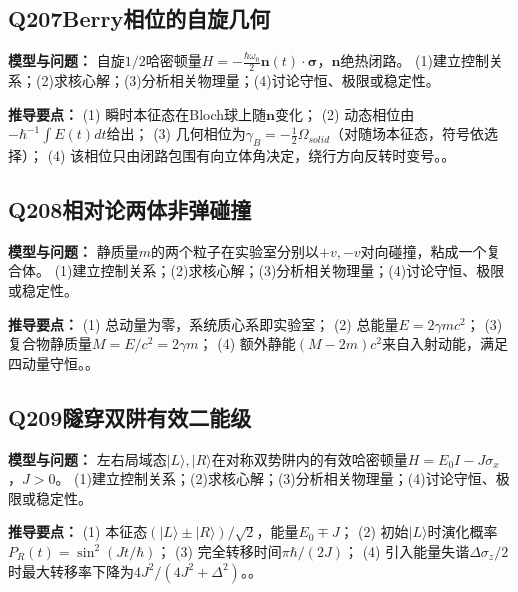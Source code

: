 \par\medskip

\subsection*{Q207\quad Berry相位的自旋几何}

\textbf{模型与问题：} 自旋$1/2$哈密顿量$H=-\frac{\hbar\omega_0}{2}\mathbf n(t)\cdot\boldsymbol\sigma$，$\mathbf n$绝热闭路。 (1)建立控制关系；(2)求核心解；(3)分析相关物理量；(4)讨论守恒、极限或稳定性。

\par\textbf{推导要点：} (1) 瞬时本征态在Bloch球上随$\mathbf n$变化； (2) 动态相位由$-\hbar^{-1}\int E(t)dt$给出； (3) 几何相位为$\gamma_B=-\frac12\Omega_{solid}$（对随场本征态，符号依选择）； (4) 该相位只由闭路包围有向立体角决定，绕行方向反转时变号。。

\par\medskip

\subsection*{Q208\quad 相对论两体非弹碰撞}

\textbf{模型与问题：} 静质量$m$的两个粒子在实验室分别以$+v,-v$对向碰撞，粘成一个复合体。 (1)建立控制关系；(2)求核心解；(3)分析相关物理量；(4)讨论守恒、极限或稳定性。

\par\textbf{推导要点：} (1) 总动量为零，系统质心系即实验室； (2) 总能量$E=2\gamma mc^2$； (3) 复合物静质量$M=E/c^2=2\gamma m$； (4) 额外静能$(M-2m)c^2$来自入射动能，满足四动量守恒。。

\par\medskip

\subsection*{Q209\quad 隧穿双阱有效二能级}

\textbf{模型与问题：} 左右局域态$|L\rangle,|R\rangle$在对称双势阱内的有效哈密顿量$H=E_0I-J\sigma_x$，$J>0$。 (1)建立控制关系；(2)求核心解；(3)分析相关物理量；(4)讨论守恒、极限或稳定性。

\par\textbf{推导要点：} (1) 本征态$(|L\rangle\pm|R\rangle)/\sqrt2$，能量$E_0\mp J$； (2) 初始$|L\rangle$时演化概率$P_R(t)=\sin^2(Jt/\hbar)$； (3) 完全转移时间$\pi\hbar/(2J)$； (4) 引入能量失谐$\Delta\sigma_z/2$时最大转移率下降为$4J^2/(4J^2+\Delta^2)$。。

\par\medskip
